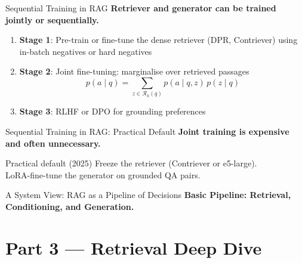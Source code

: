 \documentclass[aspectratio=169, xcolor=table]{beamer}
\newif\ifanimated
\newcommand{\cpause}{\ifanimated\pause\fi}
\begin{document}
\begin{frame}{Sequential Training in RAG}
\textbf{Retriever and generator can be trained jointly or sequentially.}

\vspace{0.7em}
\begin{enumerate}
  \item \textbf{Stage 1}: Pre-train or fine-tune the dense retriever (DPR, Contriever)
    using in-batch negatives or hard negatives
  \item \textbf{Stage 2}: Joint fine-tuning: marginalise over retrieved passages
    \[ p(a \mid q) = \sum_{z \in \mathcal{R}_k(q)} p(a \mid q, z)\, p(z \mid q) \]
  \item \textbf{Stage 3}: RLHF or DPO for grounding preferences
\end{enumerate}
\end{frame}

\begin{frame}{Sequential Training in RAG: Practical Default}
\textbf{Joint training is expensive and often unnecessary.}

\vspace{0.7em}
\begin{block}{Practical default (2025)}
\large
Freeze the retriever (Contriever or e5-large).\\[0.5em]
LoRA-fine-tune the generator on grounded QA pairs.
\end{block}

\cpause
\vspace{0.5em}
\begin{center}
\resizebox{1.0\textwidth}{!}{

}
\end{center}

\end{frame}


\begin{frame}{A System View: RAG as a Pipeline of Decisions}
\textbf{Basic Pipeline: Retrieval, Conditioning, and Generation.}

\vspace{0.5em}
\begin{center}
\resizebox{1.0\textwidth}{!}{

}
\end{center}
\end{frame}

\section{Part 3 --- Retrieval Deep Dive}
\end{document}
